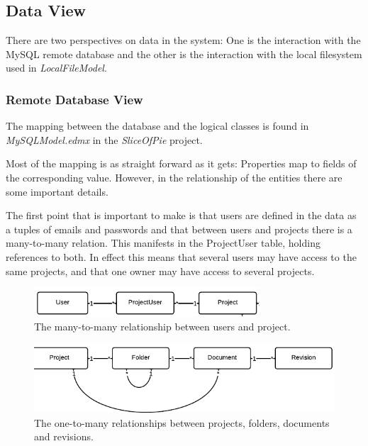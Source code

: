 \subsection{Data View}

There are two perspectives on data in the system: One is the interaction with the MySQL remote database
and the other is the interaction with the local filesystem used in \emph{LocalFileModel}.

\subsubsection{Remote Database View}
The mapping between the database and the logical classes is found in \emph{MySQLModel.edmx} in the
\emph{SliceOfPie} project.

Most of the mapping is as straight forward as it gets: Properties map to fields of the corresponding value.
However, in the relationship of the entities there are some important details.

The first point that is important to make is that users are defined in the data as a tuples of emails
and passwords and that between users and projects there is a many-to-many relation. This manifests
in the ProjectUser table, holding references to both. In effect this means that several users may 
have access to the same projects, and that one owner may have access to several projects.

\begin{figure}[htb]
	\centering
	\includegraphics[width=0.75\textwidth]{Software_architecture/graphics/db-user-project.png}
	\caption{The many-to-many relationship between users and project.}
	\label{fig:db-user-project}
\end{figure}

\begin{figure}[htb]
	\centering
	\includegraphics[width=1.0\textwidth]{Software_architecture/graphics/db-project-folder-document.png}
	\caption{The one-to-many relationships between projects, folders, documents and revisions.}
	\label{fig:db-project-folder-document}
\end{figure}

